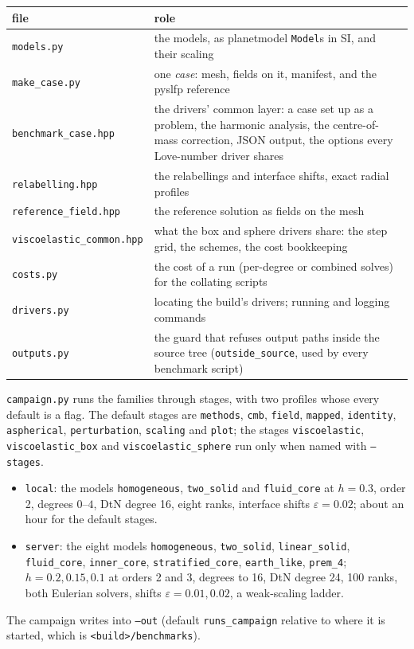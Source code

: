 \documentclass[11pt]{article}
\numberwithin{equation}{section}
\newcommand{\eps}{\varepsilon}
\newcommand{\code}[1]{\texttt{#1}}
\begin{document}
\begin{center}
\small
\begin{tabular}{@{}lP{10.5cm}@{}}
\toprule
file & role \\
\midrule
\code{models.py} & the models, as planetmodel \code{Model}s in SI, and their scaling \\
\code{make\_case.py} & one \emph{case}: mesh, fields on it, manifest, and the pyslfp reference \\
\code{benchmark\_case.hpp} & the drivers' common layer: a case set up as a problem, the harmonic analysis, the centre-of-mass correction, JSON output, the options every Love-number driver shares \\
\code{relabelling.hpp} & the relabellings and interface shifts, exact radial profiles \\
\code{reference\_field.hpp} & the reference solution as fields on the mesh \\
\code{viscoelastic\_common.hpp} & what the box and sphere drivers share: the step grid, the schemes, the cost bookkeeping \\
\code{costs.py} & the cost of a run (per-degree or combined solves) for the collating scripts \\
\code{drivers.py} & locating the build's drivers; running and logging commands \\
\code{outputs.py} & the guard that refuses output paths inside the source tree (\code{outside\_source}, used by every benchmark script) \\
\bottomrule
\end{tabular}
\end{center}

\code{campaign.py} runs the families through stages, with two profiles
whose every default is a flag. The default stages are \code{methods},
\code{cmb}, \code{field}, \code{mapped}, \code{identity},
\code{aspherical}, \code{perturbation}, \code{scaling} and \code{plot};
the stages \code{viscoelastic}, \code{viscoelastic\_box} and
\code{viscoelastic\_sphere} run only when named with \code{--stages}.
\begin{itemize}[leftmargin=*]
\item \code{local}: the models \code{homogeneous}, \code{two\_solid} and
  \code{fluid\_core} at $h=0.3$, order 2, degrees $0$--$4$, DtN degree 16,
  eight ranks, interface shifts $\eps=0.02$; about an hour for the default
  stages.
\item \code{server}: the eight models \code{homogeneous},
  \code{two\_solid}, \code{linear\_solid}, \code{fluid\_core},
  \code{inner\_core}, \code{stratified\_core}, \code{earth\_like},
  \code{prem\_4}; $h=0.2,0.15,0.1$ at orders 2 and 3, degrees to 16, DtN
  degree 24, 100 ranks, both Eulerian solvers, shifts $\eps=0.01,0.02$, a
  weak-scaling ladder.
\end{itemize}
The campaign writes into \code{--out} (default \code{runs\_campaign}
relative to where it is started, which is \code{<build>/benchmarks}).
\end{document}
